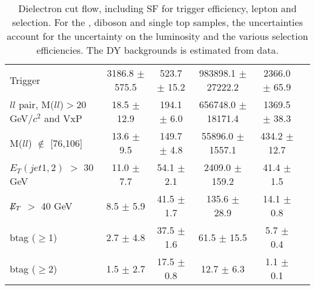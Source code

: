\documentclass[amsmath,amssymb]{revtex4}
\begin{document}
\begin{landscape}
\begin{table}[p]
\begin{tabular}{|l|c|c|c|c|c|}
Trigger & 3186.8 $\pm$ 575.5 & 523.7 $\pm$ 15.2 & 983898.1 $\pm$ 27222.2 & 2366.0 $\pm$ 65.9 \\
$ll$ pair, M($ll$)$>$20 GeV$/c^2$ and VxP & 18.5 $\pm$ 12.9 & 194.1 $\pm$ 6.0 & 656748.0 $\pm$ 18171.4 & 1369.5 $\pm$ 38.3 \\
M($ll$) $\notin$ [76,106] & 13.6 $\pm$ 9.5 & 149.7 $\pm$ 4.8 & 55896.0 $\pm$ 1557.1 & 434.2 $\pm$ 12.7 \\
$E_T(jet1,2)$ $>$ 30 GeV & 11.0 $\pm$ 7.7 & 54.1 $\pm$ 2.1 & 2409.0 $\pm$ 159.2 & 41.4 $\pm$ 1.5 \\
$\not\!\!E_T$ $>$ 40 GeV & 8.5 $\pm$ 5.9 & 41.5 $\pm$ 1.7 & 135.6 $\pm$ 28.9 & 14.1 $\pm$ 0.8 \\
btag ($\ge$1) & 2.7 $\pm$ 4.8 & 37.5 $\pm$ 1.6 & 61.5 $\pm$ 15.5 & 5.7 $\pm$ 0.4 \\
btag ($\ge$2) & 1.5 $\pm$ 2.7 & 17.5 $\pm$ 0.8 & 12.7 $\pm$ 6.3 & 1.1 $\pm$ 0.1 \\
\hline 
\hline
\end{tabular}
\caption{ Dielectron cut flow, including SF for trigger efficiency, lepton and \met selection. For the \ttbar, diboson and single top samples, the uncertainties account for the uncertainty on the luminosity and the various selection efficiencies. The DY backgrounds is estimated from data.}
\label{Table:CutFlow_ee}
\end{table}
\end{landscape}
\clearpage
\end{document}
